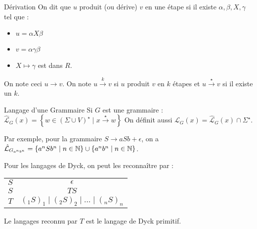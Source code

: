 \documentclass{cours}
\begin{document}
\begin{définition}{Dérivation}{}
    On dit que $u$ produit (ou dérive) $v$ en une étape si il existe $\alpha, \beta, X, \gamma$ tel que : 
    \begin{itemize}
        \item $u = \alpha X \beta$
        \item $v = \alpha \gamma \beta$
        \item $X \mapsto \gamma$ est dans $R$.
    \end{itemize}
    On note ceci $u \rightarrow v$. On note $u \xrightarrow{k} v$ si $u$ produit $v$ en $k$ étapes et $u \xrightarrow{\star} v$ si il existe un $k$.
\end{définition}

\begin{définition}{Langage d'une Grammaire}{}
    Si $G$ est une grammaire : $\hat{\mathcal{L}}_{G}(x) = \left\{w \in \left(\Sigma \cup V\right)^{\star}\mid x \xrightarrow{\star} w \right\}$
    On définit aussi $\mathcal{L}_{G}(x) = \hat{\mathcal{L}}_{G}(x) \cap \Sigma^{\star}$.
\end{définition}

Par exemple, pour la grammaire $S \rightarrow aSb + \epsilon$, on a $\hat{\mathcal{L}}_{G_{a^{n}b^{n}}} = \left\{a^{n}Sb^{n}\mid n \in \mathbb{N} \right\} \cup \left\{a^{n}b^{n} \mid n \in \mathbb{N} \right\}$.

Pour les langages de Dyck, on peut les reconnaître par : 
\begin{center}
    \begin{tabular}{c@{$\rightarrow$}c}
        $S$ & $\epsilon$ \\
        $S$ & $T S$\\
        $T$ & $(_{1} S )_{1} \mid (_{2} S )_{2} \mid \ldots \mid (_{n} S )_{n}$
    \end{tabular}
\end{center}

\begin{remark}
    Le langages reconnu par $T$ est le langage de Dyck primitif. 
\end{remark}
\end{document}
